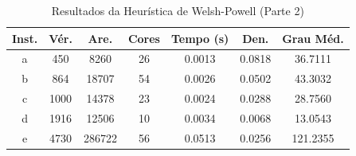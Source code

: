 \begin{table}[H]
\centering
\caption{Resultados da Heurística de Welsh-Powell (Parte 2)}
\label{tab:resultados_heuristica}
\begin{tabular}{ccccccc}
\toprule
\textbf{Inst.} & \textbf{Vér.} & \textbf{Are.} & \textbf{Cores} & \textbf{Tempo (s)} & \textbf{Den.} & \textbf{Grau Méd.} \\
\midrule
a & 450 & 8260 & 26 & 0.0013 & 0.0818 & 36.7111 \\
b & 864 & 18707 & 54 & 0.0026 & 0.0502 & 43.3032 \\
c & 1000 & 14378 & 23 & 0.0024 & 0.0288 & 28.7560 \\
d & 1916 & 12506 & 10 & 0.0034 & 0.0068 & 13.0543 \\
e & 4730 & 286722 & 56 & 0.0513 & 0.0256 & 121.2355 \\
\bottomrule
\end{tabular}
\end{table}
